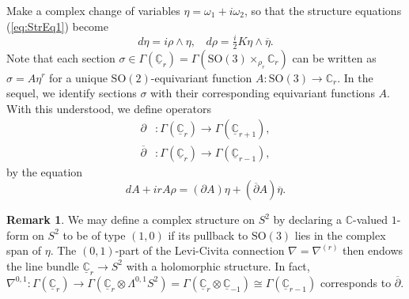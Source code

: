 \documentclass[11pt]{article}
\newcommand{\SO}{\mathrm{SO}}
\newcommand{\C}{\mathbb{C}}
\newcommand{\uC}{\underline{\mathbb{C}}}
\theoremstyle{definition}
\newtheorem{rmk}[thm]{Remark}
\numberwithin{equation}{section}
\begin{document}
\indent Make a complex change of variables $\eta = \omega_1 + i \omega_2$, so that the structure equations (\ref{eq:StrEq1}) become
\begin{equation*}
    d \eta = i \rho \wedge \eta, \:\:\:\: d \rho = \tfrac{i}{2} K \eta \wedge \overline{\eta}.
\end{equation*}
Note that each section $\sigma \in \Gamma(\underline{\C}_r) = \Gamma( \SO(3) \times_{\rho_r} \C_r)$ can be written as $\sigma = A \eta^r$ for a unique $\SO(2)$-equivariant function $A \colon \SO(3) \to \C_r$.  In the sequel, we identify sections $\sigma$ with their corresponding equivariant functions $A$.  With this understood, we define operators
\begin{equation*}
\begin{aligned}
    \partial &: \Gamma( \uC_r ) \to \Gamma(\uC_{r+1}), \\
    \overline{\partial} &: \Gamma( \uC_r ) \to \Gamma(\uC_{r-1}),
\end{aligned}
\end{equation*}
by the equation
\begin{equation}\label{eq:dA}
    d A + i r A \rho = \left( \partial A \right) \eta + \left( \overline{\partial} A \right) \overline{\eta}.
\end{equation}

\begin{rmk} We may define a complex structure on $S^2$ by declaring a $\C$-valued $1$-form on $S^2$ to be of type $(1,0)$ if its pullback to $\SO(3)$ lies in the complex span of $\eta$.  The $(0,1)$-part of the Levi-Civita connection $\nabla = \nabla^{(r)}$ then endows the line bundle $\underline{\C}_r \to S^2$ with a holomorphic structure.  In fact, $\nabla^{0,1} \colon \Gamma(\underline{ \mathbb{C}}_r  ) \to  \Gamma( \underline{ \mathbb{C}}_r \otimes \Lambda^{0,1}S^2 ) = \Gamma( \underline{ \mathbb{C}}_r \otimes \underline{\C}_{-1} ) \cong \Gamma( \underline{\mathbb{C}}_{r-1})$ corresponds to $\overline{\partial}$.
\end{rmk}
\end{document}
